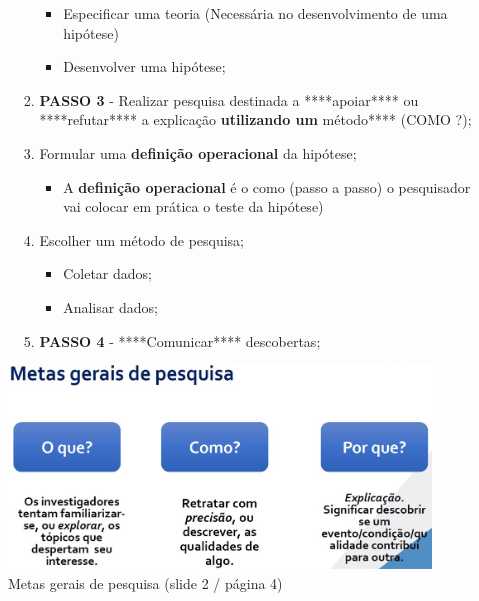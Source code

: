 \documentclass[
]{book}
\providecommand{\tightlist}{%
  \setlength{\itemsep}{0pt}\setlength{\parskip}{0pt}}
\begin{document}
\begin{itemize}
\begin{itemize}
\begin{enumerate}
      \begin{itemize}
      \tightlist
      \item
        Especificar uma teoria (Necessária no desenvolvimento de uma hipótese)
      \item
        Desenvolver uma hipótese;\\
      \end{itemize}
    \item
      \textbf{PASSO 3} - Realizar pesquisa destinada a ****apoiar**** ou ****refutar**** a explicação \textbf{utilizando um }método**** (COMO ?);
    \item
      Formular uma \textbf{definição operacional} da hipótese;

      \begin{itemize}
      \tightlist
      \item
        A \textbf{definição operacional} é o como (passo a passo) o pesquisador vai colocar em prática o teste da hipótese)
      \end{itemize}
    \item
      Escolher um método de pesquisa;

      \begin{itemize}
      \tightlist
      \item
        Coletar dados;
      \item
        Analisar dados;
      \end{itemize}
    \item
      \textbf{PASSO 4} - ****Comunicar**** descobertas;
    \end{enumerate}
  \end{itemize}
\end{itemize}

\begin{figure}

{\centering \includegraphics[width=0.8\linewidth]{imagens/slide-2-pagina-4-metas-gerais-de-pesquisa} 

}

\caption{Metas gerais de pesquisa (slide 2 / página 4)}\label{fig:unnamed-chunk-9}
\end{figure}
\end{document}
